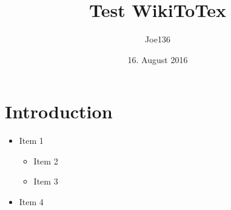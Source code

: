 \documentclass{article}
\title{Test WikiToTex}
\author{Joe136}
\date{16. August 2016}
\newcommand{\wikilist}[1]{\iffalse #1 \fi}
\begin{document}
\maketitle


\chapter{Introduction}

\wikilist{
- Item 1
-- Item 2
-- Item 3
- Item 4
}
\begin{itemize}
   \item Item 1
   \begin{itemize}
      \item Item 2
      \item Item 3
   \end{itemize}
   \item Item 4
\end{itemize}



\end{document}
